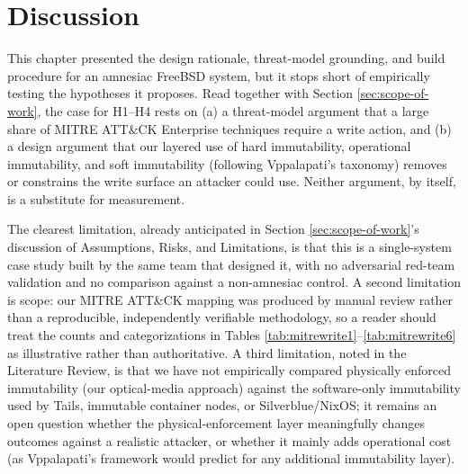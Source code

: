 \section{Discussion}
\label{sec:amnesiac-discussion}
This chapter presented the design rationale, threat-model grounding, and build procedure for an \gls{amnesiac} FreeBSD system, but it stops short of empirically testing the hypotheses it proposes.  Read together with Section \ref{sec:scope-of-work}, the case for H1--H4 rests on (a) a threat-model argument that a large share of MITRE ATT\&CK Enterprise techniques require a write action, and (b) a design argument that our layered use of \gls{hard immutability}, \gls{operational immutability}, and \gls{soft immutability} (following Vppalapati's taxonomy) removes or constrains the write surface an attacker could use.  Neither argument, by itself, is a substitute for measurement.

The clearest limitation, already anticipated in Section \ref{sec:scope-of-work}'s discussion of Assumptions, Risks, and Limitations, is that this is a single-system case study built by the same team that designed it, with no adversarial red-team validation and no comparison against a non-amnesiac control.  A second limitation is scope: our MITRE ATT\&CK mapping was produced by manual review rather than a reproducible, independently verifiable methodology, so a reader should treat the counts and categorizations in Tables \ref{tab:mitrewrite1}--\ref{tab:mitrewrite6} as illustrative rather than authoritative.  A third limitation, noted in the Literature Review, is that we have not empirically compared physically enforced immutability (our optical-media approach) against the software-only immutability used by Tails, immutable container nodes, or Silverblue/NixOS; it remains an open question whether the physical-enforcement layer meaningfully changes outcomes against a realistic attacker, or whether it mainly adds operational cost (as Vppalapati's framework would predict for any additional immutability layer).

